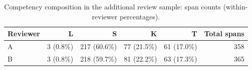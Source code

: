 \documentclass[fleqn,12pt]{wlpeerj}
\begin{document}
\setcounter{table}{12}
\begin{table}[htbp]
\caption{Competency composition in the additional review sample: span counts (within-reviewer percentages).}
\label{tab:additional-review-composition}
\centering\small
\begin{tabular}{@{}lrrrrr@{}}
\toprule
Reviewer & L & S & K & T & Total spans \\
\midrule
A & 3 (0.8\%) & 217 (60.6\%) & 77 (21.5\%) & 61 (17.0\%) & 358 \\
B & 3 (0.8\%) & 218 (59.7\%) & 81 (22.2\%) & 63 (17.3\%) & 365 \\
\bottomrule
\end{tabular}
\end{table}

\end{document}

